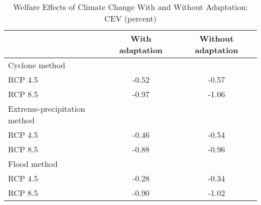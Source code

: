 \begin{table}[H] 
\singlespace 
\center 
\caption{Welfare Effects of Climate Change With and Without Adaptation: CEV (percent)} \label{tab:welfare_cc}
\vspace{-.1in} 
\begin{tabular}{l c c}\hline 
\hline 
 	& With adaptation & Without adaptation  \\ 
\hline 
Cyclone method \\ 
\hspace{1em} RCP 4.5  &    -0.52 &    -0.57   \\\hspace{1em} RCP 8.5 &    -0.97 &    -1.06   \\Extreme-precipitation method \\ 
\hspace{1em} RCP 4.5 &     -0.46 &    -0.54   \\\hspace{1em} RCP 8.5&     -0.88 &    -0.96   \\Flood method \\ 
\hspace{1em} RCP 4.5&    -0.28 &    -0.34   \\\hspace{1em} RCP 8.5 &    -0.90 &    -1.02   \\\hline 
\end{tabular}
\end{table} 
